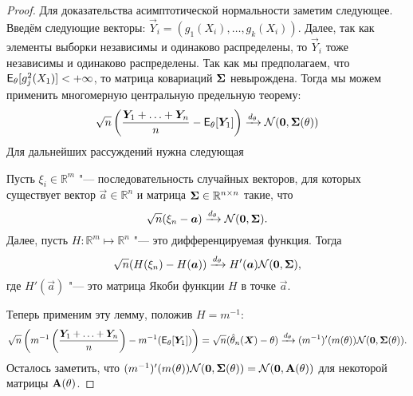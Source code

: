 \begin{proof}
	Для доказательства асимптотической нормальности заметим следующее.
	Введём следующие векторы: $\vec{Y}_{i} = (g_{1}(X_{i}), \ldots, g_{k}(X_{i}))$.
	Далее, так как элементы выборки независимы и одинаково распределены, то $\vec{Y}_{i}$ тоже независимы и одинаково распределены.
	Так как мы предполагаем, что $\operatorname{\mathsf{E}}_{\theta}[g_{j}^{2}(X_{1})] < + \infty$, то матрица ковариаций $\mathbf{\Sigma}$ невырождена.
	Тогда мы можем применить многомерную центральную предельную теорему:
	\[
		\sqrt{n}\left(\frac{\bm{Y}_{1} + \ldots + \bm{Y}_{n}}{n} - \operatorname{\mathsf{E}}_{\theta}[\bm{Y}_{1}]\right) \xrightarrow{d_{\theta}} \mathcal{N}(\bm{0}, \mathbf{\Sigma}(\theta))
	\]
	Для дальнейших рассуждений нужна следующая
	\begin{lemma}
		Пусть $\xi_{i} \in \mathbb{R}^{m}$ "--- последовательность случайных векторов, для которых существует вектор $\vec{a} \in \mathbb{R}^{n}$ и матрица $\mathbf{\Sigma} \in \mathbb{R}^{n \times n}$ такие, что 
		\[
			\sqrt{n}(\xi_{n} - \bm{a}) \xrightarrow{d_{\theta}} \mathcal{N}(\bm{0}, \mathbf{\Sigma}).
		\]
		Далее, пусть $H \colon \mathbb{R}^{m} \mapsto \mathbb{R}^{n}$ "--- это дифференцируемая функция. Тогда
		\[
			\sqrt{n}(H(\xi_{n}) - H(\bm{a})) \xrightarrow{d_{\theta}} H'(\bm{a})\mathcal{N}(\bm{0}, \mathbf{\Sigma}),
		\]
		где $H'(\vec{a})$ "--- это матрица Якоби функции $H$ в точке $\vec{a}$.
	\end{lemma}
	Теперь применим эту лемму, положив $H = m^{-1}$:
	\[
		\sqrt{n}\left(m^{-1}\left(\frac{\bm{Y}_{1} + \ldots + \bm{Y}_{n}}{n}\right) - m^{-1}(\operatorname{\mathsf{E}}_{\theta}[\bm{Y}_{1}])\right) = \sqrt{n}(\hat{\theta}_{n}(\bm{X}) - \theta) \xrightarrow{d_{\theta}} (m^{-1})'(m(\theta))\mathcal{N}(\bm{0}, \mathbf{\Sigma}(\theta)).
	\]
	Осталось заметить, что $(m^{-1})'(m(\theta))\mathcal{N}(\bm{0}, \mathbf{\Sigma}(\theta)) = \mathcal{N}(\bm{0}, \mathbf{A}(\theta))$ для некоторой матрицы $\mathbf{A}(\theta)$.
\end{proof}

